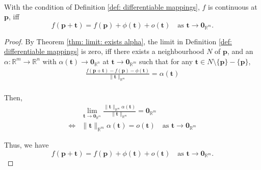 \begin{lemma}
	\label{lm: differentiable mapping: alt-def}
	\
	
	With the condition of Definition \ref{def: differentiable mappings}, $f$ is continuous at $\mathbf p$, iff
	$$
	f(\mathbf p + \mathbf t) = f(\mathbf p) + \phi(\mathbf t) + o(\mathbf t) \quad \text{as $\mathbf t \to \mathbf 0_{\mathbb R^m}$}.
	$$
	
	\begin{proof}
		By Theorem \ref{thm: limit: exists alpha}, the limit in Definition \ref{def: differentiable mappings} is zero, iff there exists a neighbourhood $N$ of $\mathbf p$, and an $\alpha: \mathbb R^m \to \mathbb R^n$ with $\alpha(\mathbf t) \to \mathbf 0_{\mathbb R^n}$ at $\mathbf t \to \mathbf 0_{\mathbb R^m}$ such that for any $\mathbf t \in N \setminus \{ \mathbf p \} - \{ \mathbf p \}$,
		$$
		\begin{aligned}
			\frac{f(\mathbf p + \mathbf t) - f(\mathbf p) - \phi(\mathbf t)}{\| \mathbf t \|_{\mathbb R^m}} = \alpha(\mathbf t) \\
		\end{aligned}
		$$
		
		Then,
		$$
		\begin{aligned}
			& \lim_{\mathbf t \to \mathbf 0_{\mathbb R^m}} \frac{\| \mathbf t \|_{\mathbb R^m} \alpha (\mathbf t)}{\| \mathbf t \|_{\mathbb R^m}} = \mathbf 0_{\mathbb R^m} \\
			\iff & \| \mathbf t \|_{\mathbb R^m} \alpha(\mathbf t) = o(\mathbf t) \quad \text{as $\mathbf t \to \mathbf 0_{\mathbb R^m}$}
		\end{aligned}
		$$
		
		Thus, we have
		$$
		f(\mathbf p + \mathbf t) = f(\mathbf p) + \phi(\mathbf t) + o(\mathbf t) \quad \text{as $\mathbf t \to \mathbf 0_{\mathbb R^m}$}.
		$$
	\end{proof}
\end{lemma}


